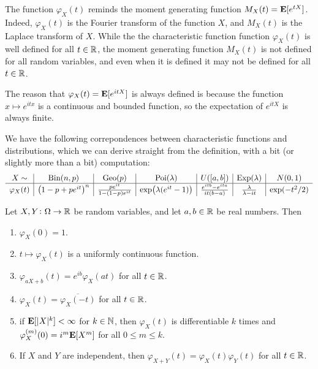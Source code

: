 \documentclass[11pt,a4paper]{article}
\begin{document}
\begin{remark}
  The function $\varphi_X(t)$ reminds the moment generating function
  $M_X(t) = \mathbf{E}[e^{tX}]$.
  Indeed, $\varphi_X(t)$
  is the Fourier transform of the function $X$,
  and $M_X(t)$ is the Laplace transform of $X$.
  While the the characteristic function function $\varphi_X(t)$
  is well defined for all $t \in \mathbb{R}$,
  the moment generating function $M_X(t)$ is not defined for all
  random variables, and even when it is defined it may not
  be defined for all $t \in \mathbb{R}$.
\end{remark}

\begin{remark}
  The reason that $\varphi_X(t) = \mathbf{E}[e^{it X}]$ is
  always defined is because the function $x \mapsto e^{itx}$
  is a continuous and bounded function,
  so the expectation of $e^{it X}$ is always finite.
\end{remark}

\begin{remark}
  We have the following correpondences between characteristic functions
  and distributions, which we can derive straight from the definition,
  with a bit (or slightly more than a bit) computation:
\renewcommand\arraystretch{1.5}
\[
\begin{array}{c|c|c|c|c|c|c}
  X \sim & \operatorname{Bin}(n,p) & \operatorname{Geo}(p) & \operatorname{Poi}(\lambda) 
         & U([a,b]) & \operatorname{Exp}(\lambda) & N(0,1) \\ \hline
  \varphi_X(t) & \big(1-p + p e^{it}\big)^n
  & \frac{p e^{it}}{1-(1-p)e^{it}}
  & \exp\!\big(\lambda(e^{it}-1)\big)
  & \frac{e^{itb}-e^{ita}}{it(b-a)}
  & \frac{\lambda}{\lambda - i t}
  & \exp(-t^2/2)
\end{array}
\]
\end{remark}

\begin{proposition}
  Let $X,Y \colon \Omega \to \mathbb{R}$ be random variables,
  and let $a,b \in \mathbb{R}$ be real numbers.
  Then
  \begin{enumerate}
    \item[(1)] $\varphi_X(0) = 1$.
    \item[(2)] $t \mapsto \varphi_X(t)$ is a uniformly continuous function.
    \item[(3)] $\varphi_{aX + b}(t) = e^{ib} \varphi_X(at)$ for all $t \in \mathbb{R}$.
    \item[(4)] $\varphi_X(t) = \overline{\varphi_X(-t)}$ for all $t \in \mathbb{R}$.
    \item[(5)] if $\mathbf{E}[|X|^k] < \infty$ for $k \in \mathbb{N}$,
      then $\varphi_X(t)$ is differentiable $k$ times and
      $\varphi_X^{(m)}(0) = i^m \mathbf{E}[X^m]$ for all $0 \le m \le k$.
    \item[(6)] If $X$ and $Y$ are independent,
      then $\varphi_{X + Y}(t) = \varphi_X(t)\varphi_Y(t)$ for all $t \in \mathbb{R}$.
  \end{enumerate}
\end{proposition}
\end{document}
